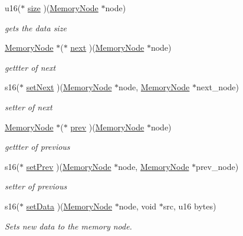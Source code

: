 \begin{DoxyCompactItemize}
u16($\ast$ \hyperlink{structmemory__node__ops__s_aac6e0ccb9192cefc1fc6ec9826a11f90}{size} )(\hyperlink{structmemory__node__s}{Memory\+Node} $\ast$node)
\begin{DoxyCompactList}\small\item\em gets the data size \end{DoxyCompactList}\item 
\hyperlink{structmemory__node__s}{Memory\+Node} $\ast$($\ast$ \hyperlink{structmemory__node__ops__s_a87ce72f198cd7c9df08a90d9cebbdde9}{next} )(\hyperlink{structmemory__node__s}{Memory\+Node} $\ast$node)
\begin{DoxyCompactList}\small\item\em gettter of next \end{DoxyCompactList}\item 
s16($\ast$ \hyperlink{structmemory__node__ops__s_ab2ec1c03766f20d2d69c37e658c0e4b2}{set\+Next} )(\hyperlink{structmemory__node__s}{Memory\+Node} $\ast$node, \hyperlink{structmemory__node__s}{Memory\+Node} $\ast$next\+\_\+node)
\begin{DoxyCompactList}\small\item\em setter of next \end{DoxyCompactList}\item 
\hyperlink{structmemory__node__s}{Memory\+Node} $\ast$($\ast$ \hyperlink{structmemory__node__ops__s_a64ffb2209e35813b777210e7644bc090}{prev} )(\hyperlink{structmemory__node__s}{Memory\+Node} $\ast$node)
\begin{DoxyCompactList}\small\item\em gettter of previous \end{DoxyCompactList}\item 
s16($\ast$ \hyperlink{structmemory__node__ops__s_a352f9fd77b1f1ccff52c0e285b06bd85}{set\+Prev} )(\hyperlink{structmemory__node__s}{Memory\+Node} $\ast$node, \hyperlink{structmemory__node__s}{Memory\+Node} $\ast$prev\+\_\+node)
\begin{DoxyCompactList}\small\item\em setter of previous \end{DoxyCompactList}\item 
s16($\ast$ \hyperlink{structmemory__node__ops__s_a7b21a53d026216de8e44299e4b6191fb}{set\+Data} )(\hyperlink{structmemory__node__s}{Memory\+Node} $\ast$node, void $\ast$src, u16 bytes)
\begin{DoxyCompactList}\small\item\em Sets new data to the memory node. \end{DoxyCompactList}\item 

\end{DoxyCompactItemize}
